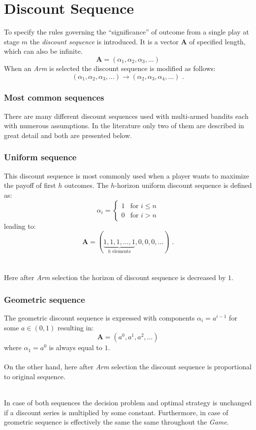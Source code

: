 \documentclass[12pt, a4paper, pdflatex, leqno]{report}
\begin{document}
\section{Discount Sequence}
To specify the rules governing the ``significance'' of outcome from a single play at stage $m$ the \emph{discount sequence} is introduced. It is a vector $\mathbf{A}$ of specified length, which can also be infinite.
$$
\mathbf{A} = \left( \alpha_1, \alpha_2, \alpha_3, ... \right)
$$
When an \emph{Arm} is selected the discount sequence is modified as follows:
$$
\left( \alpha_1, \alpha_2, \alpha_3, ... \right)
\rightarrow
\left( \alpha_2, \alpha_3, \alpha_4, ... \right) \text{ .}
$$

\subsubsection{Most common sequences}
There are many different discount sequences used with multi-armed bandits each with numerous assumptions. In the literature only two of them are described in great detail and both are presented below.
{
\subsubsection{Uniform sequence}
This discount sequence is most commonly used when a player wants to maximize the payoff of first $h$ outcomes.
The $h$-horizon uniform discount sequence is defined as:
\[
 \alpha_i =
  \begin{cases}
   1 & \text{for } i \leq n \\
   0 & \text{for } i > n
  \end{cases}
\]
leading to:
\[
  \mathbf{A} = ( \underbrace{ 1, 1, 1, ..., 1}_{h\text{ elements}}, 0, 0, 0, ... ) \text{ .}
\]\\
\\
Here after \emph{Arm} selection the horizon of discount sequence is decreased by $1$.


\subsubsection{Geometric sequence}
The geometric discount sequence is expressed with components $\alpha_i = a^{i-1}$ for some $a \in ( 0, 1 )$ resulting in:
$$
\mathbf{A} = \left( a^0, a^1, a^2, ... \right)
$$
where $\alpha_1 = a^0$ is always equal to $1$.\\
\\
On the other hand, here after \emph{Arm} selection the discount sequence is proportional to original sequence.\\
\\

}
In case of both sequences the decision problem and optimal strategy is unchanged if a discount series is multiplied by some constant. Furthermore, in case of geometric sequence is effectively the same the same throughout the \emph{Game}.
\end{document}
